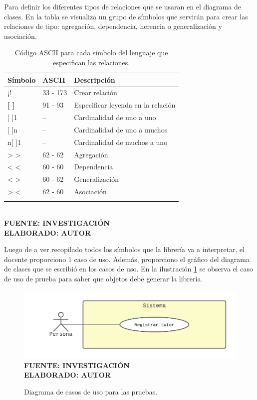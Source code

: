 Para definir los diferentes tipos de relaciones que se usaran en el diagrama de clases. En la tabla se visualiza un grupo de símbolos que servirán para crear las relaciones de tipo: agregación, dependencia, herencia o generalización y asociación. 

\newpage

\begin{table}[h!]
	\centering
	\caption{Código ASCII para cada símbolo del lenguaje que especifican las relaciones.}
	\begin{tabular}{p{2cm}p{4cm}p{6cm}}
		\toprule
		\textbf{Símbolo} & \textbf{ASCII} & \textbf{Descripción} \\
		\midrule
		¡! & 33 - 173 & Crear relación \\
		\addlinespace
		\textbf{[ ]} & 91 - 93 & Especificar leyenda en la relación \\
		\addlinespace
		1[ ]1 & -- & Cardinalidad de uno a uno \\
		\addlinespace
		1[ ]n & -- & Cardinalidad de uno a muchos \\
		\addlinespace
		n[ ]1 & -- & Cardinalidad de muchos a uno \\
		\addlinespace
		> > & 62 - 62 & Agregación \\
		\addlinespace
		< < & 60 - 60 & Dependencia \\
		\addlinespace
		< > & 60 - 62 & Generalización \\
		\addlinespace
		> < & 62 - 60 & Asociación \\
		\addlinespace
		\bottomrule
	\end{tabular}
	\vspace{4mm}
	{\footnotesize \textbf{\\ FUENTE: INVESTIGACIÓN} \textbf{\\ ELABORADO: AUTOR}}
\end{table}

Luego de a ver recopilado todos los símbolos que la librería va a interpretar, el docente proporciono 1 caso de uso. Además, proporciono el gráfico del diagrama de clases que se escribió en los casos de uso. En la ilustración \ref{fig:usecasetest} se observa el caso de uso de prueba para saber que objetos debe generar la librería. 

\begin{figure}[h!]
	\centering
	\caption{Diagrama de casos de uso para las pruebas.}
	\includegraphics[width=13cm]{img/usecaseTest.png}
	\label{fig:usecasetest}
	\vspace{4mm}
	{\footnotesize \textbf{\\ FUENTE: INVESTIGACIÓN} \textbf{\\ ELABORADO: AUTOR}}
\end{figure}

